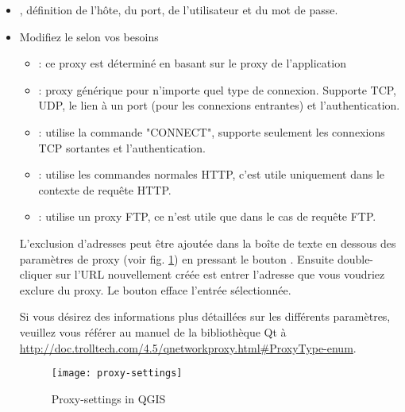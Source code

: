 \begin{itemize}
\item {}, définition de l'hôte, du port, de l'utilisateur et du mot de passe.
\item Modifiez le  selon vos besoins
 \begin{itemize}
  \item {}: ce proxy est déterminé en basant sur le proxy de l'application
  \item {}: proxy générique pour n'importe quel type de connexion. Supporte TCP, UDP, le lien à un port (pour les connexions entrantes) et l'authentication.
  \item {}: utilise la commande "CONNECT", supporte seulement les connexions TCP sortantes et l'authentication.
  \item {}: utilise les commandes normales HTTP, c'est utile uniquement dans le contexte de requête HTTP.
  \item {}: utilise un proxy FTP, ce n'est utile que dans le cas de requête FTP.
\end{itemize}

L'exclusion d'adresses peut être ajoutée dans la boîte de texte en dessous des paramètres de proxy (voir fig. \ref{fig:proxy-settings}) en pressant le bouton . Ensuite double-cliquer sur l'URL nouvellement créée est entrer l'adresse que vous voudriez exclure du proxy. Le bouton  efface l'entrée sélectionnée.

Si vous désirez des informations plus détaillées sur les différents paramètres, veuillez vous référer au manuel de la bibliothèque Qt à \url{http://doc.trolltech.com/4.5/qnetworkproxy.html#ProxyType-enum}.

\begin{figure}[ht]
   \begin{center}
   \caption{Proxy-settings in QGIS \nixcaption}
   \texttt{[image: proxy-settings]}
   \label{fig:proxy-settings}
\end{center} 
\end{figure}

\begin{Tip} \caption{\textsc{Using Proxies}}
\end{Tip}


\end{itemize}
